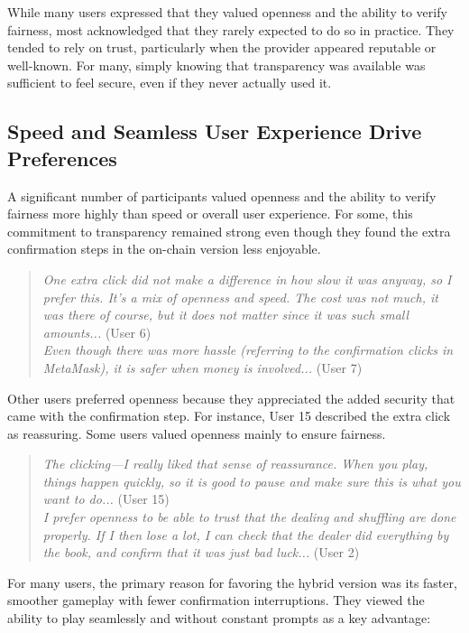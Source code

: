 \documentclass[10pt,conference]{IEEEtran}
\begin{document}
While many users expressed that they valued openness and the ability to verify fairness, most acknowledged that they rarely expected to do so in practice. They tended to rely on trust, particularly when the provider appeared reputable or well-known. For many, simply knowing that transparency was available was sufficient to feel secure, even if they never actually used it.


\subsection{Speed and Seamless User Experience Drive Preferences}
A significant number of participants valued openness and the ability to verify fairness more highly than speed or overall user experience. For some, this commitment to transparency remained strong even though they found the extra confirmation steps in the on-chain version less enjoyable. 

\begin{quote}
\textit{One extra click did not make a difference in how slow it was anyway, so I prefer this. It’s a mix of openness and speed. The cost was not much, it was there of course, but it does not matter since it was such small amounts...} (User 6)\\
\textit{Even though there was more hassle (referring to the confirmation clicks in MetaMask), it is safer when money is involved...} (User 7)
\end{quote}

Other users preferred openness because they appreciated the added security that came with the confirmation step. For instance, User 15 described the extra click as reassuring. Some users valued openness mainly to ensure fairness.

\begin{quote}
\textit{The clicking—I really liked that sense of reassurance. When you play, things happen quickly, so it is good to pause and make sure this is what you want to do...} (User 15) \\
\textit{I prefer openness to be able to trust that the dealing and shuffling are done properly. If I then lose a lot, I can check that the dealer did everything by the book, and confirm that it was just bad luck...} (User 2)
\end{quote}


For many users, the primary reason for favoring the hybrid version was its faster, smoother gameplay with fewer confirmation interruptions. They viewed the ability to play seamlessly and without constant prompts as a key advantage:
\end{document}
